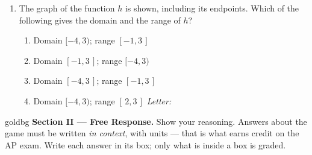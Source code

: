 \documentclass[10pt]{article}
\begin{document}
\begin{enumerate}[leftmargin=1.9em, itemsep=11pt]
\item \begin{minipage}[t]{0.58\linewidth}
      The graph of the function $h$ is shown, including its endpoints. Which of the following
      gives the domain and the range of $h$?
      \begin{enumerate}[leftmargin=2.6em, itemsep=3pt]
        \item[(A)] Domain $[-4, 3)$; range $[-1, 3\,]$
        \item[(B)] Domain $[-1, 3\,]$; range $[-4, 3)$
        \item[(C)] Domain $[-4, 3\,]$; range $[-1, 3\,]$
        \item[(D)] Domain $[-4, 3)$; range $[\,2, 3\,]$ \hfill\textit{Letter:}~\gradedblank[id=ap5, type=choice, points=1, answer=A]{0.42in}{13pt}
      \end{enumerate}
      \end{minipage}\hfill
      \begin{minipage}[t]{0.36\linewidth}
      \vspace{-4pt}
      \centering
      \end{minipage}

\end{enumerate}

\newpage

\begin{headlinebox}{goldbg}
\small
\textbf{Section II --- Free Response.} Show your reasoning. Answers about the game must be
written \emph{in context}, with units --- that is what earns credit on the AP exam. Write each answer in its box; only what is inside a box is graded.
\end{headlinebox}

\vspace{0.08in}
\end{document}
